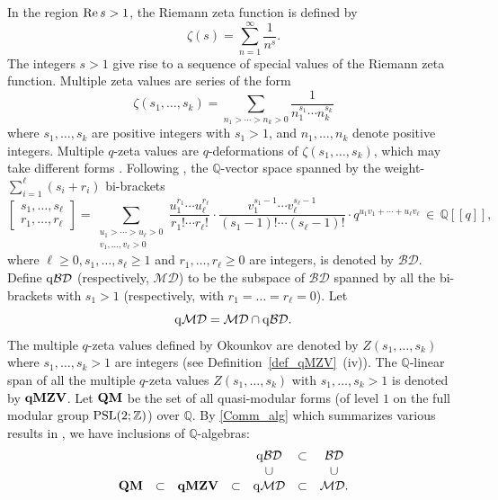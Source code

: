 \documentclass[12pt, reqno]{amsart}
\theoremstyle{definition}
\theoremstyle{remark}
\numberwithin{equation}{section}
\newcommand{\BD}{\mathcal {BD}}
\newcommand{\MD}{\mathcal {MD}}
\newcommand{\Q}{ \mathbb Q }
\newcommand{\qBD}{{\rm q}{\mathcal {BD}}}
\newcommand{\qMD}{{\rm q}{\mathcal {MD}}}
\newcommand{\qMZV}{ {\bf qMZV} }
\newcommand{\Z}{ \mathbb Z }
\numberwithin{equation}{section}
\begin{document}
In the region ${\rm Re} \, s > 1$, the Riemann zeta function is defined by 
$$
\zeta(s) = \sum_{n =1}^\infty \frac{1}{n^{s}}.
$$
The integers $s > 1$ give rise to a sequence of special values of the Riemann zeta function.
Multiple zeta values are series of the form
$$
\zeta(s_1, \ldots, s_k) = \sum_{n_1 > \cdots > n_k > 0} 
\frac{1}{n_1^{s_1} \cdots n_k^{s_k}}
$$
where $s_1, \ldots, s_k$ are positive integers with $s_1 > 1$, 
and $n_1, \ldots, n_k$ denote positive integers.
Multiple $q$-zeta values are $q$-deformations of 
$\zeta(s_1, \ldots, s_k)$, which may take different forms 
\cite{Bac, BK1, BK2, BK3, Bra1, Bra2, Oko, OT, Zhao, Zud}. 
Following \cite{Bac, BK2}, the $\Q$-vector space spanned by 
the weight-$\sum_{i=1}^\ell (s_i +r_i)$ bi-brackets
$$
  \begin{bmatrix} s_1, \ldots, s_\ell\\r_1, \ldots, r_\ell \end{bmatrix}
= \sum_{\substack{u_1 > \cdots > u_\ell > 0\\v_1, \ldots, v_\ell > 0}}
\frac{u_1^{r_1} \cdots u_\ell^{r_\ell}}{r_1! \cdots r_\ell!} \cdot
\frac{v_1^{s_1-1} \cdots v_\ell^{s_\ell-1}}{(s_1-1)! \cdots (s_\ell-1)!} 
\cdot q^{u_1v_1 + \cdots + u_\ell v_\ell} \, \in \, \Q[[q]],
$$
where $\ell \ge 0, s_1, \ldots, s_\ell \ge 1$ and 
$r_1, \ldots, r_\ell \ge 0$ are integers, is denoted by $\BD$. 
Define $\qBD$ (respectively, $\MD$) to be the subspace of $\BD$ spanned 
by all the bi-brackets with $s_1 > 1$ (respectively, 
with $r_1 = \ldots = r_\ell = 0$). Let 
$$
\qMD = \MD \cap \qBD.
$$
The multiple $q$-zeta values defined by Okounkov \cite{Oko} 
are denoted by $Z(s_1, \ldots, s_k)$ where $s_1, \ldots, s_k > 1$ 
are integers (see Definition~\ref{def_qMZV}~(iv)). 
The $\Q$-linear span of all the multiple $q$-zeta values 
$Z(s_1, \ldots, s_k)$ with $s_1, \ldots, s_k > 1$ is denoted by $\qMZV$. 
Let ${\bf QM}$ be the set of all quasi-modular forms 
(of level $1$ on the full modular group ${\rm PSL}(2; \Z)$) over $\Q$. 
By \eqref{Comm_alg} which summarizes various results in 
\cite{Bac, BK1, BK2, BK3}, we have inclusions of $\Q$-algebras: 
\begin{eqnarray}   \label{Intro-Comm_alg}
\begin{matrix}
&&&&\qBD &\subset&\BD   \\
&&&&\cup &&\cup   \\
{\bf QM}&\subset &\qMZV&\subset &\qMD&\subset&\MD.  
\end{matrix}
\end{eqnarray}
\end{document}
